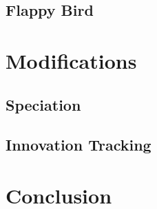 \documentclass[letterpaper]{article}
\begin{document}
\subsection{Flappy Bird} \label{sec:flappy}

\section{Modifications} \label{sec:mods}

\subsection{Speciation} \label{sec:speciation}

\subsection{Innovation Tracking} \label{sec:innovations}

\section{Conclusion} \label{sec:conclusion}

\medskip


\end{document}
